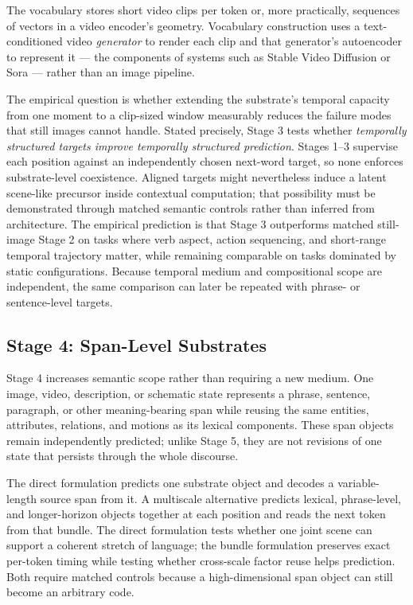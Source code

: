 \documentclass[11pt,a4paper]{article}
\begin{document}
The vocabulary stores short video clips per token or, more practically, sequences of vectors in a video encoder's geometry. Vocabulary construction uses a text-conditioned video \emph{generator} to render each clip and that generator's autoencoder to represent it --- the components of systems such as Stable Video Diffusion \cite{svd2023} or Sora \cite{sora2024} --- rather than an image pipeline.

The empirical question is whether extending the substrate's temporal capacity from one moment to a clip-sized window measurably reduces the failure modes that still images cannot handle. Stated precisely, Stage 3 tests whether \emph{temporally structured targets improve temporally structured prediction}. Stages 1--3 supervise each position against an independently chosen next-word target, so none enforces substrate-level coexistence. Aligned targets might nevertheless induce a latent scene-like precursor inside contextual computation; that possibility must be demonstrated through matched semantic controls rather than inferred from architecture. The empirical prediction is that Stage 3 outperforms matched still-image Stage 2 on tasks where verb aspect, action sequencing, and short-range temporal trajectory matter, while remaining comparable on tasks dominated by static configurations. Because temporal medium and compositional scope are independent, the same comparison can later be repeated with phrase- or sentence-level targets.

\subsection{Stage 4: Span-Level Substrates}

Stage 4 increases semantic scope rather than requiring a new medium. One image, video, description, or schematic state represents a phrase, sentence, paragraph, or other meaning-bearing span while reusing the same entities, attributes, relations, and motions as its lexical components. These span objects remain independently predicted; unlike Stage 5, they are not revisions of one state that persists through the whole discourse.

The direct formulation predicts one substrate object and decodes a variable-length source span from it. A multiscale alternative predicts lexical, phrase-level, and longer-horizon objects together at each position and reads the next token from that bundle. The direct formulation tests whether one joint scene can support a coherent stretch of language; the bundle formulation preserves exact per-token timing while testing whether cross-scale factor reuse helps prediction. Both require matched controls because a high-dimensional span object can still become an arbitrary code.
\end{document}

